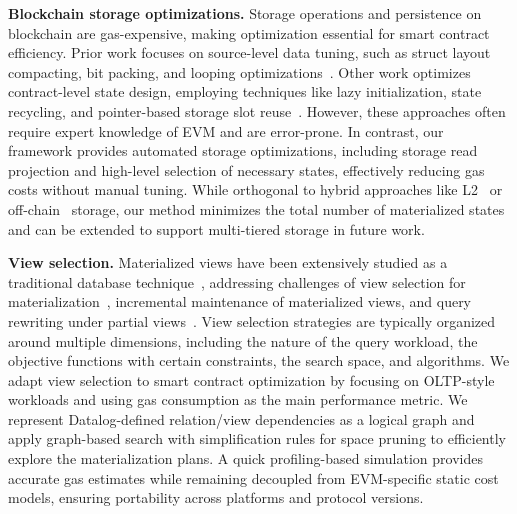 \smallskip
\noindent \textbf{Blockchain storage optimizations.}
Storage operations and persistence on blockchain are gas-expensive, making optimization essential for smart contract efficiency.
Prior work focuses on source-level data tuning, such as struct layout compacting, bit packing, and looping optimizations~\cite{chen2017under}. Other work optimizes contract-level state design, employing techniques like lazy initialization, state recycling, and pointer-based storage slot reuse~\cite{antonino2021solidifier, wood2014ethereum}. However, these approaches often require expert knowledge of EVM and are error-prone.
In contrast, our framework provides automated storage optimizations, including storage read projection and high-level selection of necessary states, effectively reducing gas costs without manual tuning.
While orthogonal to hybrid approaches like L2~\cite{gangwal2023survey, sguanci2021layer} or off-chain~\cite{hepp2018chain, xu2021slimchain, jayabalan2022scalable} storage, our method minimizes the total number of materialized states and can be extended to support multi-tiered storage in future work.

\smallskip
\noindent \textbf{View selection.}
Materialized views have been extensively studied as a traditional database technique~\cite{view_selection_survey}, addressing challenges of view selection for materialization~\cite{DBS-020}, incremental maintenance of materialized views, and query rewriting under partial views~\cite{ans_query_w_view}. 
View selection strategies are typically organized around multiple dimensions, including the nature of the query workload, the objective functions with certain constraints, the search space, and algorithms.
We adapt view selection to smart contract optimization by focusing on OLTP-style workloads and using gas consumption as the main performance metric. We represent Datalog-defined relation/view dependencies as a logical graph and apply graph-based search with simplification rules for space pruning to efficiently explore the materialization plans. A quick profiling-based simulation provides accurate gas estimates while remaining decoupled from EVM-specific static cost models, ensuring portability across platforms and protocol versions.